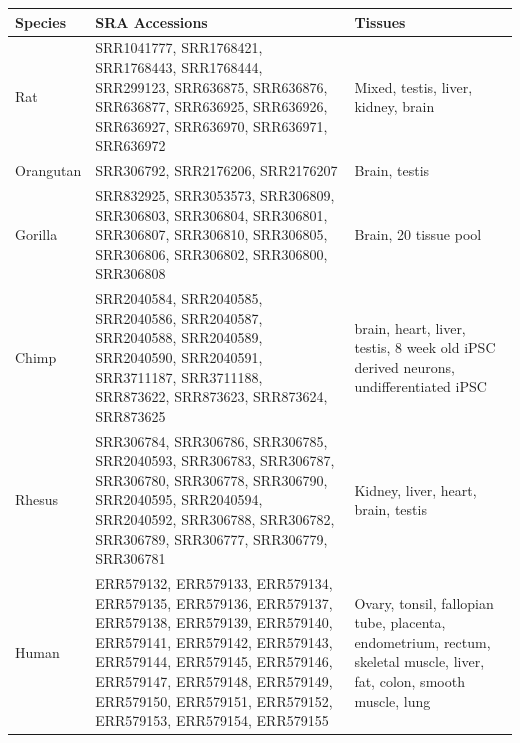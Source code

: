 \begin{center}
\small
{}
\label{supp_table:rnaseq_sra_table}
\begin{longtable}{|p{}|p{}|p{}|} \hline
Species  & SRA Accessions & Tissues \\ \hline
Rat    & SRR1041777, SRR1768421, SRR1768443, SRR1768444, SRR299123, SRR636875, SRR636876, SRR636877, SRR636925, SRR636926, SRR636927, SRR636970, SRR636971, SRR636972                                                                                                                                          & Mixed, testis, liver, kidney, brain                                          \\ \hline
Orangutan & SRR306792, SRR2176206, SRR2176207                                                                                                                                                                                                       & Brain, testis                                                     \\ \hline
Gorilla  & SRR832925, SRR3053573, SRR306809, SRR306803, SRR306804, SRR306801, SRR306807, SRR306810, SRR306805, SRR306806, SRR306802, SRR306800, SRR306808                                                                                                                                                 & Brain, 20 tissue pool                                                 \\ \hline
Chimp   & SRR2040584, SRR2040585, SRR2040586, SRR2040587, SRR2040588, SRR2040589, SRR2040590, SRR2040591, SRR3711187, SRR3711188, SRR873622, SRR873623, SRR873624, SRR873625                                                                                                                                       & brain, heart, liver, testis, 8 week old iPSC derived neurons, undifferentiated iPSC                  \\ \hline
Rhesus  & SRR306784, SRR306786, SRR306785, SRR2040593, SRR306783, SRR306787, SRR306780, SRR306778, SRR306790, SRR2040595, SRR2040594, SRR2040592, SRR306788, SRR306782, SRR306789, SRR306777, SRR306779, SRR306781                                                                                                                    &  Kidney, liver, heart, brain, testis                                                          \\ \hline
Human   & ERR579132, ERR579133, ERR579134, ERR579135, ERR579136, ERR579137, ERR579138, ERR579139, ERR579140, ERR579141, ERR579142, ERR579143, ERR579144, ERR579145, ERR579146, ERR579147, ERR579148, ERR579149, ERR579150, ERR579151, ERR579152, ERR579153, ERR579154, ERR579155                                                                                     & Ovary, tonsil, fallopian tube, placenta, endometrium, rectum, skeletal muscle, liver, fat, colon, smooth muscle, lung \\ \hline

\end{longtable}
\end{center}
